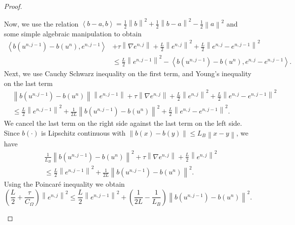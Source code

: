 \documentclass[../Main/main.tex]{subfiles}
\begin{document}
\begin{proof}
\begin{itemize}
\begin{equation}
		\end{equation}
		Now, we use the relation $\left \langle b-a,b\right \rangle = \frac{1}{2}\left \|b\right\|^2+ \frac{1}{2}\left \|b-a\right\|^2-\frac{1}{2}\left \|a\right\|^2$ and some simple algebraic manipulation to obtain
		\begin{equation}
			\begin{aligned}
\left\langle b(u^{n,j-1})-b(u^n),e^{n,j-1}\right \rangle &+ \tau \left \| \nabla e^{n,j}\right \| + \frac{L}{2}\left \|e^{n,j}\right\|^2 + \frac{L}{2}\left \|e^{n,j}-e^{n,j-1}\right\|^2 \\ & \leq \frac{L}{2}\left \|e^{n,j-1}\right\|^2- \left\langle b(u^{n,j-1})-b(u^n),e^{n,j} - e^{n,j-1}\right \rangle.
			\end{aligned}
		\end{equation}
		Next, we use Cauchy Schwarz inequality on the first term, and Young's inequality on the last term
		\begin{equation}
			\begin{aligned}
&\left\| b(u^{n,j-1})-b(u^n)\right \| \left \|e^{n,j-1}\right \| + \tau \left \| \nabla e^{n,j}\right \| + \frac{L}{2}\left \|e^{n,j}\right\|^2 + \frac{L}{2}\left \|e^{n,j}-e^{n,j-1}\right\|^2 \\ & \leq \frac{L}{2}\left \|e^{n,j-1}\right\|^2 +\frac{1}{2L} \left\| b(u^{n,j-1})-b(u^n)\right\|^2+\frac{L}{2} \left \|e^{n,j} - e^{n,j-1}\right \|^2.				
\end{aligned}	
	\end{equation}
		We cancel the last term on the right side against the last term on the left side.
		Since $b(\cdot)$ is Lipschitz continuous with $\left \| b(x)-b(y)\right \| \leq L_B \left \|x-y\right \|$, we have
		\begin{equation}
			\begin{aligned}
				&\frac{1}{L_B}\left\| b(u^{n,j-1})-b(u^n)\right \|^2 + \tau \left \| \nabla e^{n,j}\right \| + \frac{L}{2}\left \|e^{n,j}\right\|^2  \\ & \leq \frac{L}{2}\left \|e^{n,j-1}\right\|^2 +\frac{1}{2L} \left\| b(u^{n,j-1})-b(u^n)\right\|^2.				
			\end{aligned}	
		\end{equation} 
		Using the Poincaré inequality we obtain
		\begin{equation}
			\left ( \frac{L}{2} + \frac{\tau}{C_{\Omega}} \right ) \left \|e^{n,j}\right \|^2 \leq \frac{L}{2} \left \|e^{n,j-1}\right \|^2+ \left ( \frac{1}{2L}-\frac{1}{L_B}\right ) \left \|b(u^{n,j-1})-b(u^n)\right \|^2.
		\end{equation}

\end{itemize}
\end{proof}
\end{document}
